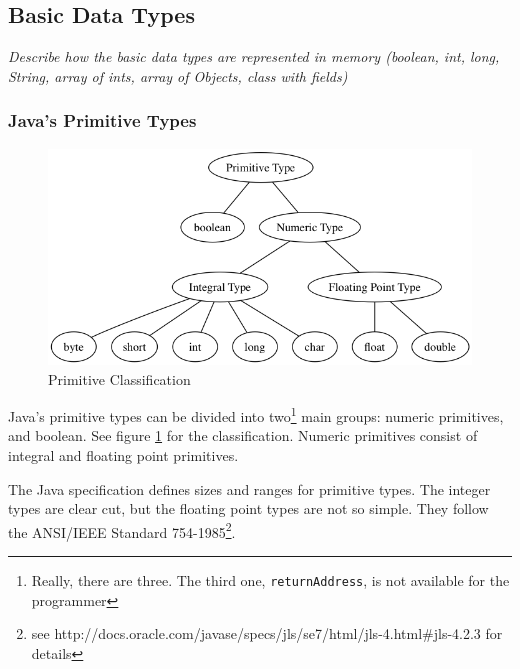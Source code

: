 \subsection{Basic Data Types}
\textit{Describe how the basic data types are represented in memory (boolean, int, long, String, array of ints, array of Objects, class with fields)}

\subsubsection{Java's Primitive Types} 
\begin{figure}[!h]\centering
\includegraphics[width=\linewidth, frame]{primitives.png}
\caption{Primitive Classification}
\label{fig:primitiveTypes}
\end{figure}
Java's primitive types can be divided into two\footnote{Really, there are three. The third one, \texttt{returnAddress}, is not available for the programmer} main groups: numeric primitives, and boolean. See figure \ref{fig:primitiveTypes} for the classification.  Numeric primitives consist of integral and floating point primitives.\cite{gosling}

The Java specification\cite{gosling} defines sizes and ranges for primitive types. The integer types are clear cut, but the floating point types are not so simple. They follow the ANSI/IEEE Standard 754-1985\footnote{see http://docs.oracle.com/javase/specs/jls/se7/html/jls-4.html\#jls-4.2.3 for details}. 

